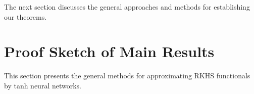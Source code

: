 \documentclass{article}
\def\NN{\mathbb N}
\numberwithin{equation}{section}
\begin{document}

 




The next section discusses the general approaches and methods for establishing our theorems.

\section{Proof Sketch of Main Results}\label{sec:method}
This section presents the general methods for approximating RKHS functionals by tanh neural networks. 
\end{document}
